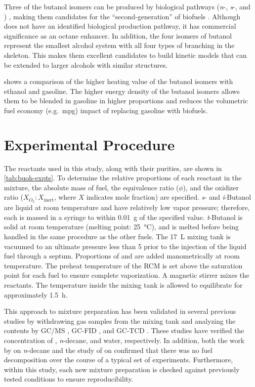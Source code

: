 \documentclass[../main.tex]{subfiles}
\begin{document}
Three of the butanol isomers can be produced
by biological pathways (\textit{n}-, \textit{s}-, and \iBuOH{})
\cite{Nigam2011,Smith2010}, making them candidates for the ``second-generation''
of biofuels \cite{Harvey2011,Nigam2011}. Although \tBuOH{} does not have
an identified biological production pathway, it has commercial significance
as an octane enhancer. In addition, the four isomers of butanol represent
the smallest alcohol system with all four types of branching in the skeleton.
This makes them excellent candidates to build kinetic models that can be
extended to larger alcohols with similar structures.

 shows a comparison of the higher heating value of
the butanol isomers with ethanol and gasoline. The higher energy density
of the butanol isomers allows them to be blended in gasoline in higher
proportions and reduces the volumetric fuel economy (e.g.\ mpg) impact
of replacing gasoline with biofuels.

\section{Experimental Procedure}
\label{sec:buoh-proc}

The reactants used in this study, along with their purities, are shown in
\cref{tab:buoh-expts}. To determine the relative proportions of each
reactant in the mixture, the absolute mass of fuel, the equivalence ratio
($\phi$), and the oxidizer ratio ($X_{O_2}:X_{\mathrm{inert}}$, where $X$
indicates mole fraction) are specified. \textit{s}- and \textit{i}-Butanol are
liquid at room temperature and have relatively low vapor pressure; therefore,
each is massed in a syringe to within \SI{0.01}{\gram} of the specified
value. \textit{t}-Butanol is solid at room temperature (melting point: \SI{25}{\degreeCelsius}),
and is melted before being handled in the same procedure as the other fuels.
The \SI{17}{\liter} mixing tank is vacuumed to an ultimate pressure less than \SI{5}{\torr} prior
to the injection of the liquid fuel through a septum. Proportions of  and
 are added manometrically at room temperature. The preheat temperature of
the RCM is set above the saturation point for each fuel to ensure complete
vaporization. A magnetic stirrer mixes the reactants. The temperature inside
the mixing tank is allowed to equilibrate for approximately \SI{1.5}{\hour}.

This approach to mixture preparation has been validated in several previous
studies by withdrawing gas samples from the mixing tank and analyzing the
contents by GC/MS \cite{Weber2011}, GC-FID \cite{Kumar2009}, and GC-TCD
\cite{Das2012}. These studies have verified the concentration of
\nBuOH{}, \textit{n}-decane, and water, respectively. In addition,
both the work by \textcite{Kumar2009} on \textit{n}-decane and the study of
\textcite{Weber2011} on \nBuOH{} confirmed that there was no fuel
decomposition over the course of a typical set of experiments. Furthermore,
within this study, each new mixture preparation is checked against previously
tested conditions to ensure reproducibility.
\end{document}
